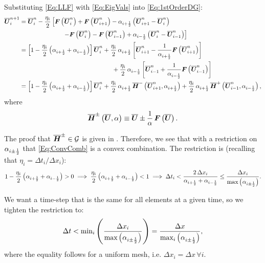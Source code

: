 \documentclass[10pt,preprint]{aastex}
\begin{document}
Substituting \eqref{Eq:LLF} with \eqref{Eq:EigVals} into \eqref{Eq:1stOrderDG}:
\begin{align}
    \ol{\bU}^{n+1}_{i}&=\ol{\bU}^{n}_{i}-\f{\eta_{i}}{2}\left[\bF\left(\ol{\bU}^{n}_{i}\right)+\bF\left(\ol{\bU}^{n}_{i+1}\right)-\alpha_{\iph}\left(\ol{\bU}^{n}_{i+1}-\ol{\bU}^{n}_{i}\right)\right.\nonumber\\
    &\left.\hspace{7em}-\bF\left(\ol{\bU}^{n}_{i}\right)-\bF\left(\ol{\bU}^{n}_{i-1}\right)+\alpha_{\imh}\left(\ol{\bU}^{n}_{i}-\ol{\bU}^{n}_{i-1}\right)\right]\nonumber\\
    &=\left[1-\f{\eta_{i}}{2}\left(\alpha_{\iph}+\alpha_{\imh}\right)\right]\ol{\bU}^{n}_{i}+\f{\eta_{i}}{2}\,\alpha_{\iph}\left[\ol{\bU}^{n}_{i+1}-\f{1}{\alpha_{\iph}}\bF\left(\ol{\bU}^{n}_{i+1}\right)\right]\nonumber\\
    &\hspace{15em}+\f{\eta_{i}}{2}\,\alpha_{\imh}\left[\ol{\bU}^{n}_{i-1}+\f{1}{\alpha_{\imh}}\bF\left(\ol{\bU}^{n}_{i-1}\right)\right]\nonumber\\
    &=\left[1-\f{\eta_{i}}{2}\left(\alpha_{\iph}+\alpha_{\imh}\right)\right]\ol{\bU}^{n}_{i}+\f{\eta_{i}}{2}\,\alpha_{\iph}\,\ol{\bH}^{-}\left(\ol{\bU}^{n}_{i+1},\alpha_{\iph}\right)+\f{\eta_{i}}{2}\,\alpha_{\iph}\,\ol{\bH}^{+}\left(\ol{\bU}^{n}_{i-1},\alpha_{\imh}\right),\label{Eq:ConvComb}
\end{align}
where
\begin{equation}\label{Eq:Hpm}
    \overline{\boldsymbol{H}}^{\pm}\left(\overline{\boldsymbol{U}},\alpha\right)\equiv\overline{\boldsymbol{U}}\pm\frac{1}{\alpha}\,\boldsymbol{F}\left(\overline{\boldsymbol{U}}\right).
\end{equation}

The proof that $\overline{\boldsymbol{H}}^{\pm}\in\mathcal{G}$ is given in \citet{Qin2016}. Therefore, we see that with a restriction on $\alpha_{i\pm\frac{1}{2}}$ that \eqref{Eq:ConvComb} is a convex combination. The restriction is (recalling that $\eta_{i}=\Delta t_{i}/\Delta x_{i}$):
\begin{equation}
    1-\frac{\eta_{i}}{2}\left(\alpha_{i+\frac{1}{2}}+\alpha_{i-\frac{1}{2}}\right)>0\implies\frac{\eta_{i}}{2}\left(\alpha_{i+\frac{1}{2}}+\alpha_{i-\frac{1}{2}}\right)<1\implies \Delta t_{i}<\frac{2\,\Delta x_{i}}{\alpha_{i+\frac{1}{2}}+\alpha_{i-\frac{1}{2}}}\leq\frac{\Delta x_{i}}{\text{max}\left(\alpha_{i\pm\frac{1}{2}}\right)}.
\end{equation}

We want a time-step that is the same for all elements at a given time, so we tighten the restriction to:
\begin{equation}
    \Delta t<\text{min}_{i}\left(\frac{\Delta x_{i}}{\text{max}\left(\alpha_{i\pm\frac{1}{2}}\right)}\right)=\frac{\Delta x}{\text{max}_{i}\left(\alpha_{i\pm\frac{1}{2}}\right)},
\end{equation}
where the equality follows for a uniform mesh, i.e. $\Delta x_{i}=\Delta x\,\forall i$.
\end{document}
